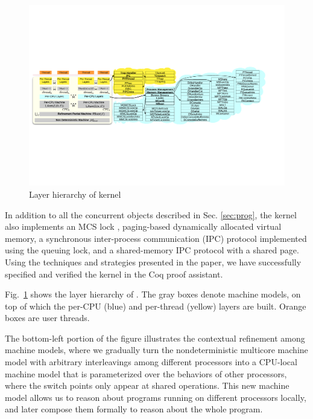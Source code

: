 


\begin{figure}[t]
\includegraphics[width=1.0\textwidth]{figs/layer_diagram.pdf}
\caption{Layer hierarchy of \cCTOS{} kernel}
\label{fig:layer_diagram}
\hrulefill
\end{figure}

In addition to all the concurrent objects described in Sec. \ref{sec:prog},
the kernel also implements an MCS lock \cite{mcs91}, paging-based dynamically
allocated virtual memory,
a synchronous inter-process communication (IPC) protocol implemented using the
queuing lock, and a shared-memory IPC protocol with a shared page.
Using the techniques and strategies presented in the paper, we have
successfully specified and verified the \cCTOS{} kernel in the Coq proof assistant.

Fig.~\ref{fig:layer_diagram} shows the layer hierarchy of  \cCTOS{}.
The gray boxes denote machine models, on top of which the
per-CPU (blue) and per-thread (yellow) layers are built. Orange boxes
are user threads.

The bottom-left portion of the figure illustrates the contextual refinement
among machine models, where we gradually turn the nondeterministic
multicore machine model with arbitrary interleavings
among different processors into a CPU-local machine model that is parameterized
over the behaviors of other processors,
where the switch points only appear at shared operations. This new machine
model allows us to reason about programs running on different processors locally,
and later compose them formally to reason about the whole program.

